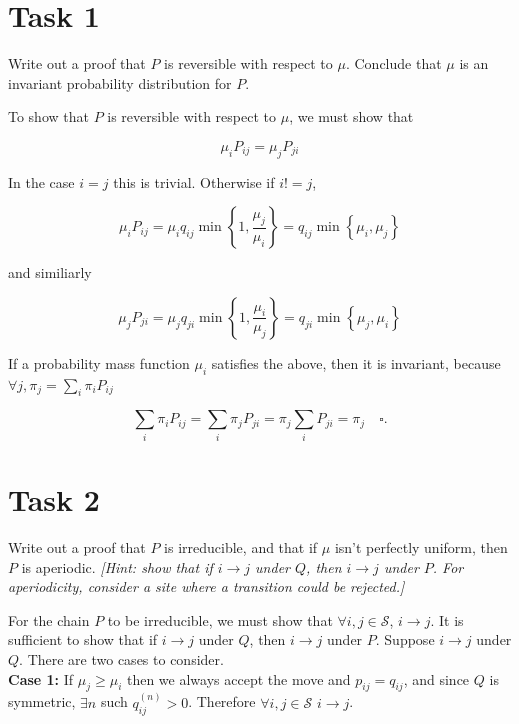 \documentclass[6pt,oneside]{article}
\begin{document}
\section*{Task 1}

Write out a proof that $P$ is reversible with respect to $\mu$. Conclude that $\mu$ is an invariant
probability distribution for $P$.

\vspace{10pt}

To show that $P$ is reversible with respect to $\mu$, we must show that

$$
\mu_iP_{ij} = \mu_jP_{ji}
$$

In the case $i=j$ this is trivial. Otherwise if $i!=j$,

$$
\mu_i P_{ij} = \mu_iq_{ij} \min\left\lbrace1, \frac{\mu_j}{\mu_i}\right\rbrace
= q_{ij} \min \left\lbrace \mu_i, \mu_j \right\rbrace
$$

and similiarly

$$
\mu_j P_{ji} = \mu_j q_{ji} \min\left\lbrace 1, \frac{\mu_i}{\mu_j}\right\rbrace
=
q_{ji}\min\left\lbrace \mu_j, \mu_i\right\rbrace
$$

If a probability mass function $\mu_i$ satisfies the above, then it is invariant, because
$\forall j, \pi_j=\sum_i \pi_i P_{ij}$

$$
\sum_i \pi_i P_{ij} = \sum_i \pi_j P_{ji} = \pi_j \sum_i P_{ji} = \pi_j
\quad\square.
$$

\section*{Task 2}

Write out a proof that $P$ is irreducible, and that if $\mu$ isn't perfectly uniform, then $P$ is aperiodic.
\emph{[Hint: show that if $i\longrightarrow j$ under $Q$, then $i\longrightarrow j$ under $P$.
For aperiodicity, consider a site where a transition could be rejected.]}

\vspace{10pt}

For the chain $P$ to be irreducible, we must show that $\forall i,j\in\mathcal{S}$, 
$i\longrightarrow j$. It is sufficient to show that if $i\longrightarrow j$ under $Q$,
then $i\longrightarrow j$ under $P$. Suppose $i\longrightarrow j$ under $Q$.
There are two cases to consider.\\

\textbf{Case 1:} If $\mu_j \geq \mu_i$ then we always accept the move and $p_{ij} = q_{ij}$,
and since $Q$ is symmetric, $\exists n$ such $q_{ij}^{(n)} > 0$. Therefore
$\forall i,j\in\mathcal{S}$ $i\longrightarrow j$.\\
\end{document}
